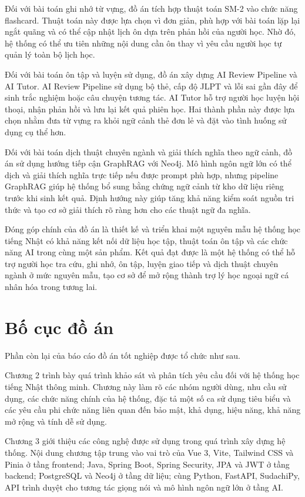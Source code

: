 \documentclass[../DoAn.tex]{subfiles}
\begin{document}
Đối với bài toán ghi nhớ từ vựng, đồ án tích hợp thuật toán SM-2 vào chức năng flashcard. Thuật toán này được lựa chọn vì đơn giản, phù hợp với bài toán lặp lại ngắt quãng và có thể cập nhật lịch ôn dựa trên phản hồi của người học. Nhờ đó, hệ thống có thể ưu tiên những nội dung cần ôn thay vì yêu cầu người học tự quản lý toàn bộ lịch học.

Đối với bài toán ôn tập và luyện sử dụng, đồ án xây dựng AI Review Pipeline và AI Tutor. AI Review Pipeline sử dụng bộ thẻ, cấp độ JLPT và lỗi sai gần đây để sinh trắc nghiệm hoặc câu chuyện tương tác. AI Tutor hỗ trợ người học luyện hội thoại, nhận phản hồi và lưu lại kết quả phiên học. Hai thành phần này được lựa chọn nhằm đưa từ vựng ra khỏi ngữ cảnh thẻ đơn lẻ và đặt vào tình huống sử dụng cụ thể hơn.

Đối với bài toán dịch thuật chuyên ngành và giải thích nghĩa theo ngữ cảnh, đồ án sử dụng hướng tiếp cận GraphRAG với Neo4j. Mô hình ngôn ngữ lớn có thể dịch và giải thích nghĩa trực tiếp nếu được prompt phù hợp, nhưng pipeline GraphRAG giúp hệ thống bổ sung bằng chứng ngữ cảnh từ kho dữ liệu riêng trước khi sinh kết quả. Định hướng này giúp tăng khả năng kiểm soát nguồn tri thức và tạo cơ sở giải thích rõ ràng hơn cho các thuật ngữ đa nghĩa.

Đóng góp chính của đồ án là thiết kế và triển khai một nguyên mẫu hệ thống học tiếng Nhật có khả năng kết nối dữ liệu học tập, thuật toán ôn tập và các chức năng AI trong cùng một sản phẩm. Kết quả đạt được là một hệ thống có thể hỗ trợ người học tra cứu, ghi nhớ, ôn tập, luyện giao tiếp và dịch thuật chuyên ngành ở mức nguyên mẫu, tạo cơ sở để mở rộng thành trợ lý học ngoại ngữ cá nhân hóa trong tương lai.

\section{Bố cục đồ án}
\label{section:1.4}

Phần còn lại của báo cáo đồ án tốt nghiệp được tổ chức như sau.

Chương 2 trình bày quá trình khảo sát và phân tích yêu cầu đối với hệ thống học tiếng Nhật thông minh. Chương này làm rõ các nhóm người dùng, nhu cầu sử dụng, các chức năng chính của hệ thống, đặc tả một số ca sử dụng tiêu biểu và các yêu cầu phi chức năng liên quan đến bảo mật, khả dụng, hiệu năng, khả năng mở rộng và tính dễ sử dụng.

Chương 3 giới thiệu các công nghệ được sử dụng trong quá trình xây dựng hệ thống. Nội dung chương tập trung vào vai trò của Vue 3, Vite, Tailwind CSS và Pinia ở tầng frontend; Java, Spring Boot, Spring Security, JPA và JWT ở tầng backend; PostgreSQL và Neo4j ở tầng dữ liệu; cùng Python, FastAPI, SudachiPy, API trình duyệt cho tương tác giọng nói và mô hình ngôn ngữ lớn ở tầng AI.
\end{document}
